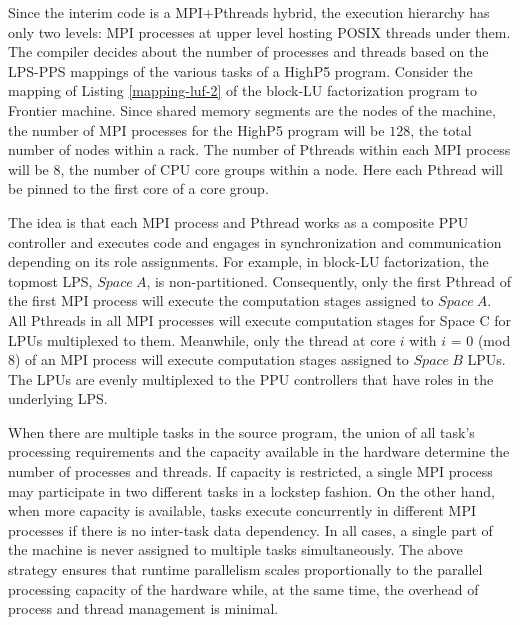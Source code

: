 \documentclass[ASNA,twocolumn]{USG} %
\begin{document}
{Since the interim code is a MPI+Pthreads hybrid, the execution hierarchy has only two levels: MPI processes at upper level hosting POSIX threads under them. The compiler decides about the number of processes and threads based on the LPS-PPS mappings of the various tasks of a HighP5 program. Consider the mapping of Listing \ref{mapping-luf-2} of the block-LU factorization program to Frontier machine. Since shared memory segments are the nodes of the machine, the number of MPI processes for the HighP5 program will be $128$, the total number of nodes within a rack. The number of Pthreads within each MPI process will be $8$, the number of CPU core groups within a node. Here each Pthread will be pinned to the first core of a core group. 

The idea is that each MPI process and Pthread works as a composite PPU controller and executes code and engages in synchronization and communication depending on its role assignments. For example, in block-LU factorization, the topmost LPS, $Space\ A$, is non-partitioned. Consequently, only the first Pthread of the first MPI process will execute the computation stages assigned to $Space\ A$. All Pthreads in all MPI processes will execute computation stages for Space C for LPUs multiplexed to them. Meanwhile, only the thread at core $i$ with $i$ = $0$ (mod $8$) of an MPI process will execute computation stages assigned to $Space\ B$ LPUs. The LPUs are evenly multiplexed to the PPU controllers that have roles in the underlying LPS. 

When there are multiple tasks in the source program, the union of all task's processing requirements and the capacity available in the hardware determine the number of processes and threads. If capacity is restricted, a single MPI process may participate in two different tasks in a lockstep fashion. On the other hand, when more capacity is available, tasks execute concurrently in different MPI processes if there is no inter-task data dependency. In all cases, a single part of the machine is never assigned to multiple tasks simultaneously. The above strategy ensures that runtime parallelism scales proportionally to the parallel processing capacity of the hardware while, at the same time, the overhead of process and thread management is minimal.

}
\end{document}
